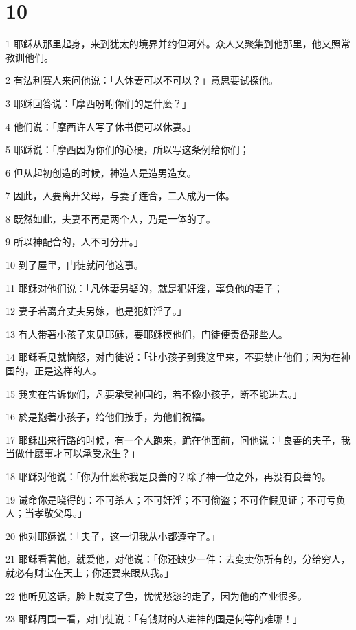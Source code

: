 \chapter{10}

\par 1 耶稣从那里起身，来到犹太的境界并约但河外。众人又聚集到他那里，他又照常教训他们。
\par 2 有法利赛人来问他说：「人休妻可以不可以？」意思要试探他。
\par 3 耶稣回答说：「摩西吩咐你们的是什麽？」
\par 4 他们说：「摩西许人写了休书便可以休妻。」
\par 5 耶稣说：「摩西因为你们的心硬，所以写这条例给你们；
\par 6 但从起初创造的时候，神造人是造男造女。
\par 7 因此，人要离开父母，与妻子连合，二人成为一体。
\par 8 既然如此，夫妻不再是两个人，乃是一体的了。
\par 9 所以神配合的，人不可分开。」
\par 10 到了屋里，门徒就问他这事。
\par 11 耶稣对他们说：「凡休妻另娶的，就是犯奸淫，辜负他的妻子；
\par 12 妻子若离弃丈夫另嫁，也是犯奸淫了。」
\par 13 有人带著小孩子来见耶稣，要耶稣摸他们，门徒便责备那些人。
\par 14 耶稣看见就恼怒，对门徒说：「让小孩子到我这里来，不要禁止他们；因为在神国的，正是这样的人。
\par 15 我实在告诉你们，凡要承受神国的，若不像小孩子，断不能进去。」
\par 16 於是抱著小孩子，给他们按手，为他们祝福。
\par 17 耶稣出来行路的时候，有一个人跑来，跪在他面前，问他说：「良善的夫子，我当做什麽事才可以承受永生？」
\par 18 耶稣对他说：「你为什麽称我是良善的？除了神一位之外，再没有良善的。
\par 19 诫命你是晓得的：不可杀人；不可奸淫；不可偷盗；不可作假见证；不可亏负人；当孝敬父母。」
\par 20 他对耶稣说：「夫子，这一切我从小都遵守了。」
\par 21 耶稣看著他，就爱他，对他说：「你还缺少一件：去变卖你所有的，分给穷人，就必有财宝在天上；你还要来跟从我。」
\par 22 他听见这话，脸上就变了色，忧忧愁愁的走了，因为他的产业很多。
\par 23 耶稣周围一看，对门徒说：「有钱财的人进神的国是何等的难哪！」
